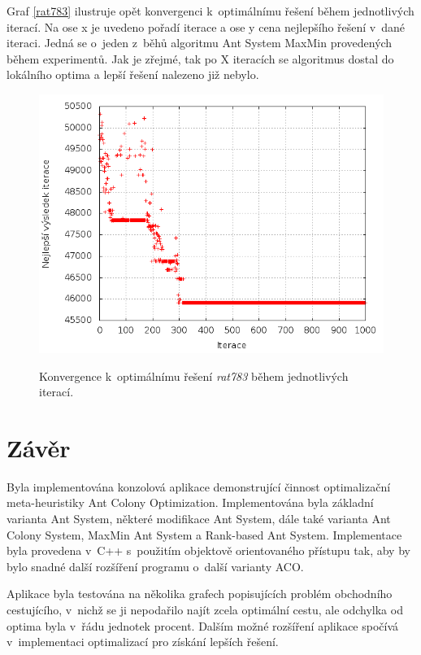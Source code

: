\documentclass[a4paper, 12pt]{article}
\begin{document}
Graf \ref{rat783} ilustruje opět konvergenci k~optimálnímu řešení během jednotlivých iterací. Na ose x je uvedeno pořadí iterace a ose y cena nejlepšího
řešení v~dané iteraci. Jedná se o~jeden z~běhů algoritmu Ant System MaxMin provedených během experimentů. Jak je zřejmé, tak po X iteracích se algoritmus
dostal do lokálního optima a lepší řešení nalezeno již nebylo.
\begin{figure}[bt]
\begin{center}
\scalebox{0.6}
{
  \includegraphics{imgs/best_lin.png}
}
\caption{
Konvergence k~optimálnímu řešení \emph{rat783} během jednotlivých iterací.}
\label{fig:best_rat}
\end{center}
\end{figure}

\section{Závěr}
\label{sec:concl}
Byla implementována konzolová aplikace demonstrující činnost optimalizační meta-heuristiky Ant Colony Optimization. 
Implementována byla základní varianta Ant System, některé
modifikace Ant System, dále také varianta Ant Colony System, MaxMin Ant System a Rank-based Ant System.
Implementace byla provedena v~C++ s~použitím objektově orientovaného přístupu tak, aby by bylo snadné další rozšíření programu o~další varianty ACO.

Aplikace byla testována na několika grafech popisujících problém obchodního cestujícího, v~nichž se ji nepodařilo najít zcela optimální cestu, ale odchylka 
od optima byla v~řádu jednotek procent. Dalším možné rozšíření aplikace spočívá v~implementaci optimalizací
pro získání lepších řešení.
\end{document}
